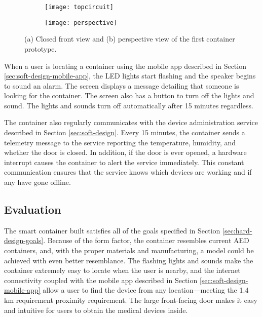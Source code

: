 \begin{figure}[h]
\centering
\begin{subfigure}{.5\textwidth}
  \centering
\texttt{[image: topcircuit]}
\label{fig:proto2-3}
\end{subfigure}%
\begin{subfigure}{.5\textwidth}
  \centering
\texttt{[image: perspective]}
\label{fig:proto2-4}
\end{subfigure}
\caption{(a) Closed front view and (b) perspective view of the first container prototype.}
\label{fig:proto2-3-4}
\end{figure}

When a user is locating a container using the mobile app described in Section \ref{sec:soft-design-mobile-app}, the LED lights start flashing and the speaker begins to sound an alarm. The screen displays a message detailing that someone is looking for the container. The screen also has a button to turn off the lights and sound. The lights and sounds turn off automatically after 15 minutes regardless. 

The container also regularly communicates with the device administration service described in Section \ref{sec:soft-design}. Every 15 minutes, the container sends a telemetry message to the service reporting the temperature, humidity, and whether the door is closed. In addition, if the door is ever opened, a hardware interrupt causes the container to alert the service immediately. This constant communication ensures that the service knows which devices are working and if any have gone offline.

\subsection{Evaluation} \label{sec:hard-eval}

The smart container built satisfies all of the goals specified in Section \ref{sec:hard-design-goals}. Because of the form factor, the container resembles current AED containers, and, with the proper materials and manufacturing, a model could be achieved with even better resemblance. The flashing lights and sounds make the container extremely easy to locate when the user is nearby, and the internet connectivity coupled with the mobile app described in Section \ref{sec:soft-design-mobile-app} allow a user to find the device from any location---meeting the 1.4 km requirement proximity requirement.  The large front-facing door makes it easy and intuitive for users to obtain the medical devices inside. 







